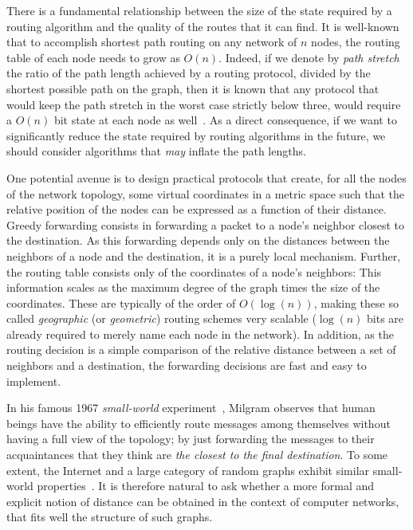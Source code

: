 \documentclass[conference]{IEEEtran}
\begin{document}
There is a fundamental relationship between the size of the state required by a routing algorithm and the quality of the routes that it can find. It is well-known that to accomplish shortest path routing on any network of $n$ nodes, the routing table of each node needs to grow as $O(n)$. Indeed, if we denote by {\em path stretch} the ratio of the path length achieved by a routing protocol, divided by the shortest possible path on the graph, then it is known that any protocol that would keep the path stretch in the worst case strictly below three, would require a $O(n)$ bit state at each node as well~\cite{gavoille97}.
As a direct consequence, if we want to significantly reduce the state required by routing algorithms in the future, we should consider algorithms that \emph{may} inflate the path lengths.






One potential avenue is to design practical protocols that create, for all the nodes of the network topology, some virtual coordinates in a metric space such that the relative position of the nodes can be expressed as a function of their distance. Greedy forwarding consists in forwarding a packet to a node's neighbor closest to the destination. As this forwarding depends only on the distances between the neighbors of a node and the destination, it is a purely local mechanism. Further, the routing table consists only of the coordinates of a node's neighbors: This information scales as the maximum degree of the graph times the size of the coordinates. These are typically of the order of $O(\log(n))$, making these so called {\em geographic} (or {\em geometric}) routing schemes very scalable ($\log(n)$ bits are already required to merely name each node in the network). In addition, as the routing decision is a simple comparison of the relative distance between a set of neighbors and a destination, the forwarding decisions are fast and easy to implement.

In his famous 1967 \emph{small-world} experiment~\cite{milgram67smallworld}, Milgram observes that human beings have the ability to efficiently route messages among themselves without having a full view of the topology; by just forwarding the messages to their acquaintances that they think are \emph{the closest to the final destination}. To some extent, the Internet and a large category of random graphs exhibit similar small-world properties~\cite{pastor-satorras04}. It is therefore natural to ask whether a more formal and explicit notion of distance can be obtained in the context of computer networks, that fits well the structure of such graphs.
\end{document}
